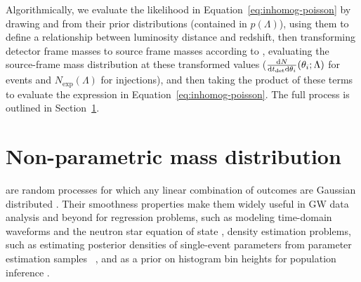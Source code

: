 \documentclass[]{aastex631}
\begin{document}
Algorithmically, we evaluate the likelihood in Equation~\ref{eq:inhomog-poisson} by drawing \Ho{} and \Omm{} from their prior distributions (contained in $p(\Lambda)$), using them to define a relationship between luminosity distance and redshift, then transforming detector frame masses to source frame masses according to , evaluating the source-frame mass distribution at these transformed values ($\frac{\text{d} N}{\text{d} t_{\det} \text{d} \theta_i} (\theta_i;\Lambda)$ for events and $N_{\text{exp}}(\Lambda)$ for injections), and then taking the product of these terms to evaluate the expression in Equation~\ref{eq:inhomog-poisson}.
The full process is outlined in Section~\ref{sec:model}.

\section{Non-parametric mass distribution}
\label{sec:model}

are random processes for which any linear combination of outcomes are Gaussian distributed \citep{rasmussen_gaussian_2006}.
Their smoothness properties make them widely useful in \ac{GW} data analysis and beyond for regression problems, such as modeling time-domain waveforms \citep{doctor_statistical_2017, huerta_eccentric_2018} and the neutron star equation of state \citep{landry_nonparametric_2019}, density estimation problems, such as estimating posterior densities of single-event parameters from parameter estimation samples ~\citep{demilio_density_2021}, and as a prior on histogram bin heights for population inference \citep{mandel_model-independent_2017, li_flexible_2021, ray_non-parametric_2023}.
\end{document}
